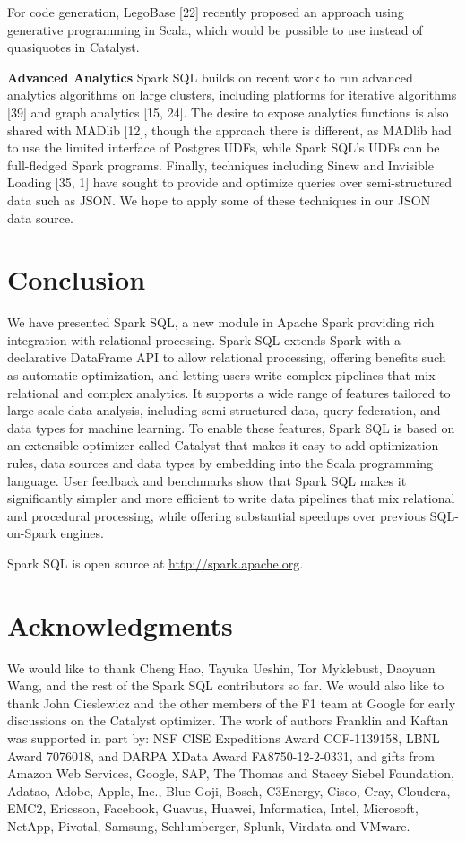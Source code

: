 \documentclass[runningheads,a4paper]{llncs}
\begin{document}
For code generation, LegoBase [22] recently proposed an approach using generative programming in Scala, which would be possible to use instead of quasiquotes in Catalyst.

\textbf{Advanced Analytics} Spark SQL builds on recent work to run advanced analytics algorithms on large clusters, including platforms for iterative algorithms [39] and graph analytics [15, 24]. The desire to expose analytics functions is also shared with MADlib [12], though the approach there is different, as MADlib had to use the limited interface of Postgres UDFs, while Spark SQL’s UDFs can be full-fledged Spark programs. Finally, techniques including Sinew and Invisible Loading [35, 1] have sought to provide and optimize queries over semi-structured data such as JSON. We hope to apply some of these techniques in our JSON data source.

\section{Conclusion}
We have presented Spark SQL, a new module in Apache Spark providing rich integration with relational processing. Spark SQL extends Spark with a declarative DataFrame API to allow relational processing, offering benefits such as automatic optimization, and letting users write complex pipelines that mix relational and complex analytics. It supports a wide range of features tailored to large-scale data analysis, including semi-structured data, query federation, and data types for machine learning. To enable these features, Spark SQL is based on an extensible optimizer called Catalyst that makes it easy to add optimization rules, data sources and data types by embedding into the Scala programming language. User feedback and benchmarks show that Spark SQL makes it significantly simpler and more efficient to write data pipelines that mix relational and procedural processing, while offering substantial speedups over previous SQL-on-Spark engines.

Spark SQL is open source at \url{http://spark.apache.org}.

\section{Acknowledgments}

We would like to thank Cheng Hao, Tayuka Ueshin, Tor Myklebust, Daoyuan Wang, and the rest of the Spark SQL contributors so far. We would also like to thank John Cieslewicz and the other members of the F1 team at Google for early discussions on the Catalyst optimizer. The work of authors Franklin and Kaftan was supported in part by: NSF CISE Expeditions Award CCF-1139158, LBNL Award 7076018, and DARPA XData Award FA8750-12-2-0331, and gifts from Amazon Web Services, Google, SAP, The Thomas and Stacey Siebel Foundation, Adatao, Adobe, Apple, Inc., Blue Goji, Bosch, C3Energy, Cisco, Cray, Cloudera, EMC2, Ericsson, Facebook, Guavus, Huawei, Informatica, Intel, Microsoft, NetApp, Pivotal, Samsung, Schlumberger, Splunk, Virdata and VMware.
\end{document}
